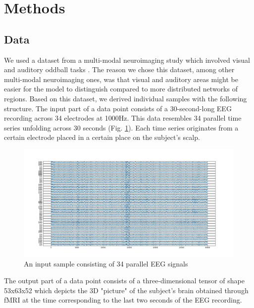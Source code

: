 \documentclass{article}
\begin{document}
\section{Methods}

\subsection{Data}

We used a dataset from a multi-modal neuroimaging study which involved visual and auditory oddball tasks \cite{noauthor_auditory_nodate}. The reason we chose this dataset, among other multi-modal neuroimaging ones, was that visual and auditory areas might be easier for the model to distinguish compared to more distributed networks of regions. Based on this dataset, we derived individual samples with the following structure. The input part of a data point consists of a 30-second-long EEG recording across 34 electrodes at 1000Hz. This data resembles 34 parallel time series unfolding across 30 seconds (Fig. \ref{fig:eeg}). Each time series originates from a certain electrode placed in a certain place on the subject's scalp.

\begin{figure}[h]
    \centering
    \includegraphics[width=\textwidth]{eeg.png}
    \caption{An input sample consisting of 34 parallel EEG signals}
    \label{fig:eeg}
\end{figure}

The output part of a data point consists of a three-dimensional tensor of shape 53x63x52 which depicts the 3D "picture" of the subject's brain obtained through fMRI at the time corresponding to the last two seconds of the EEG recording.
\end{document}
